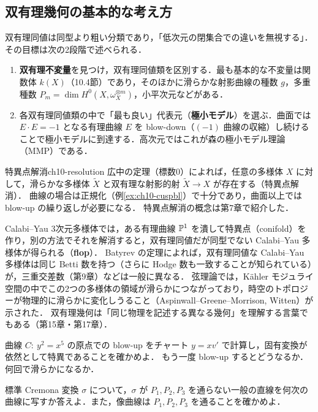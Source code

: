 \subsection{双有理幾何の基本的な考え方}

双有理同値は同型より粗い分類であり，「低次元の閉集合での違いを無視する」．
その目標は次の2段階で述べられる．
\begin{enumerate}
  \item \textbf{双有理不変量}を見つけ，双有理同値類を区別する．最も基本的な不変量は関数体 $k(X)$（10.4節）であり，そのほかに滑らかな射影曲線の種数 $g$，多重種数 $P_m=\dim H^0(X,\omega_X^{\otimes m})$，小平次元などがある．
  \item 各双有理同値類の中で「最も良い」代表元（\textbf{極小モデル}）を選ぶ．曲面では $E\cdot E=-1$ となる有理曲線 $E$ を blow-down（$(-1)$ 曲線の収縮）し続けることで極小モデルに到達する．高次元ではこれが森の極小モデル理論（MMP）である．
\end{enumerate}

\begin{myex}{特異点解消}{ch10-resolution}
広中の定理（標数0）によれば，任意の多様体 $X$ に対して，滑らかな多様体 $\widetilde X$ と双有理な射影的射 $\widetilde X\to X$ が存在する（特異点解消）．
曲線の場合は正規化（例\ref{ex:ch10-cuspbl}）で十分であり，曲面以上では blow-up の繰り返しが必要になる．
特異点解消の概念は第7章で紹介した．
\end{myex}

\begin{physbox}[双有理幾何とトポロジー変化]
Calabi--Yau 3次元多様体では，ある有理曲線 $\mathbb{P}^1$ を潰して特異点（conifold）を作り，別の方法でそれを解消すると，双有理同値だが同型でない Calabi--Yau 多様体が得られる（\textbf{flop}）．
Batyrev の定理によれば，双有理同値な Calabi--Yau 多様体は同じ Betti 数を持つ（さらに Hodge 数も一致することが知られている）が，三重交差数（第9章）などは一般に異なる．
弦理論では，Kähler モジュライ空間の中でこの2つの多様体の領域が滑らかにつながっており，時空のトポロジーが物理的に滑らかに変化しうること（Aspinwall--Greene--Morrison, Witten）が示された．
双有理幾何は「同じ物理を記述する異なる幾何」を理解する言葉でもある（第15章・第17章）．
\end{physbox}

曲線 $C:\ y^2=x^5$ の原点での blow-up をチャート $y=xv'$ で計算し，固有変換が依然として特異であることを確かめよ．
もう一度 blow-up するとどうなるか．何回で滑らかになるか．

標準 Cremona 変換 $\sigma$ について，$\sigma$ が $P_1,P_2,P_3$ を通らない一般の直線を何次の曲線に写すか答えよ．また，像曲線は $P_1,P_2,P_3$ を通ることを確かめよ．

